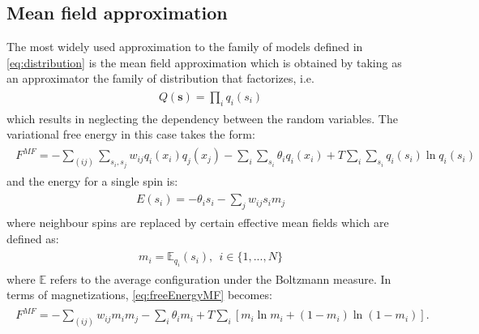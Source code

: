 \documentclass[../report/report.tex]{subfiles}
\begin{document}

\subsection{Mean field approximation}
The most widely used approximation to the family of models defined in \ref{eq:distribution} is the mean field approximation which is obtained by taking as an approximator the family of distribution that factorizes, i.e.
\begin{align}
\begin{split}
Q(\mathbf{s}) = \prod_i q_i(s_i)
\end{split}
\end{align}
which results in neglecting the dependency between the random variables. The variational free energy in this case takes the form:
\begin{align}
\begin{split}
F^{MF} = - \sum_{(ij)} \sum_{s_i, s_j} w_{ij} q_i(x_i)q_j(x_j) - \sum_{i}\sum_{s_i} \theta_i q_i(x_i) + T\sum_i \sum_{s_i} q_i(s_i)\ln q_i(s_i)
\label{eq:freeEnergyMF}
\end{split}
\end{align}
and the energy for a single spin is:
\begin{align}
\begin{split}
E(s_i) = - \theta_i s_i - \sum_j  w_{ij} s_i m_j
\end{split}
\end{align}
where neighbour spins are replaced by certain effective mean fields which are defined as:
 \begin{align}
\begin{split}
m_i = \mathbb{E}_{q_i} (s_i), ~~ i \in \{1, ..., N\}
\end{split}
\end{align}
where $\mathbb{E}$ refers to the average configuration under the Boltzmann measure. In terms of magnetizations, \ref{eq:freeEnergyMF} becomes:
\begin{align}
\begin{split}
F^{MF} = - \sum_{(ij)} w_{ij} m_i m_j - \sum_{i} \theta_i m_i  + T\sum_i \left[ m_i \ln m_i + (1-m_i)\ln(1-m_i) \right].
\label{eq:freeEnergyMF2}
\end{split}
\end{align}
\end{document}

